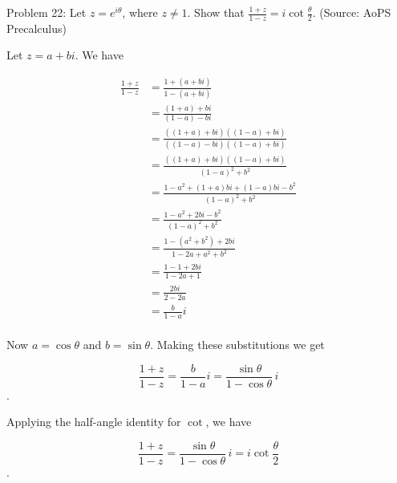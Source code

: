 Problem 22: Let $z = e^{i\theta}$, where $z\neq 1$. Show that $\displaystyle \frac{1+z}{1-z} = i\cot \frac{\theta}{2}$. (Source: AoPS Precalculus)

Let $z = a + bi$. We have

\begin{align*}
\frac{1 + z}{1 - z} &= \frac{1 + (a + bi)}{1 - (a + bi)} \\
&= \frac{(1 + a) + bi}{(1 - a) - bi} \\
&= \frac{((1 + a) + bi)((1 - a) + bi)}{((1 - a) - bi)((1 - a) + bi)} \\
&= \frac{((1 + a) + bi)((1 - a) + bi)}{(1 - a)^2 + b^2} \\
&= \frac{1 - a^2 + (1 + a)bi + (1 - a)bi - b^2}{(1 - a)^2 + b^2} \\
&= \frac{1 - a^2 + 2bi - b^2}{(1 - a)^2 + b^2} \\
&= \frac{1 - (a^2 + b^2) + 2bi}{1 - 2a + a^2 + b^2} \\
&= \frac{1 - 1 + 2bi}{1 - 2a + 1} \\
&= \frac{2bi}{2 - 2a} \\
&= \frac{b}{1 - a}i \\
\end{align*}

Now $a = \cos \theta$ and $b = \sin \theta$. Making these substitutions we get

$$ \frac{1 + z}{1 - z} = \frac{b}{1 - a}i = \frac{\sin \theta}{1 - \cos \theta} \, i$$.

Applying the half-angle identity for $\cot$, we have

$$ \frac{1 + z}{1 - z} = \frac{\sin \theta}{1 - \cos \theta} \, i = \boxed{i \cot \frac{\theta}{2}} $$.
